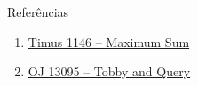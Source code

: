 \begin{frame}[fragile]{Referências}

    \begin{enumerate}
        \item \href{https://acm.timus.ru/problem.aspx?space=1&num=1146}{Timus 1146 -- Maximum Sum}
 
        \item \href{https://onlinejudge.org/index.php?option=com_onlinejudge&Itemid=8&category=24&page=show_problem&problem=4993}{OJ 13095 -- Tobby and Query} 
    \end{enumerate}

\end{frame}
